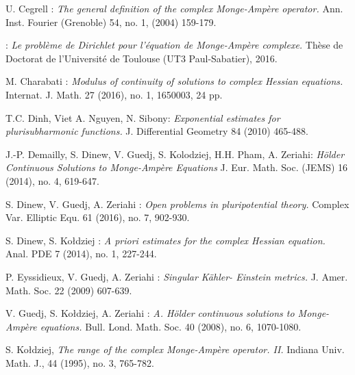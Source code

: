 \documentclass[12pt]{amsart}
\theoremstyle{definition}
\numberwithin{theorem}{section}
\numberwithin{equation}{section}
\begin{document}
{\begin{thebibliography}{X-XX}
 {U. Cegrell} : {\it  The general definition of the complex Monge-Amp\`ere operator.} Ann. Inst. Fourier (Grenoble) 54, no. 1, (2004) 159-179.
 
 
  : {\it Le probl\`eme de Dirichlet pour l'\'equation de Monge-Amp\`ere complexe.} Th\`ese de Doctorat de l'Universit\'e de Toulouse (UT3 Paul-Sabatier), 2016.


 {M. Charabati} :  {\it  Modulus of continuity of solutions to complex Hessian equations.} Internat. J. Math. 27 (2016), no. 1, 1650003, 24 pp.

 


 T.C. Dinh, Viet A. Nguyen, N. Sibony: {\it Exponential estimates for plurisubharmonic functions.} J. Differential Geometry 84 (2010) 465-488.

 J.-P. Demailly, S. Dinew, V. Guedj, S. Kolodziej, H.H. Pham, A. Zeriahi: {\it H\"older Continuous Solutions to Monge-Amp\`ere Equations} J. Eur. Math. Soc. (JEMS) 16 (2014), no. 4, 619-647. 

 {S. Dinew, V. Guedj, A. Zeriahi} : {\it Open problems in pluripotential theory. }  Complex Var. Elliptic Equ. 61 (2016), no. 7, 902-930. 


 S. Dinew, S. Ko\l dziej :  {\it  A priori estimates for the complex Hessian equation.}  Anal. PDE 7 (2014), no. 1, 227-244. 

 {P. Eyssidieux, V. Guedj, A. Zeriahi} : {\it Singular K\"ahler- Einstein metrics.}  J. Amer. Math. Soc.  22 (2009) 607-639.


 V.  Guedj, S. Ko\l dziej, A. Zeriahi : {\it  A. H\"older continuous solutions to Monge-Amp\`ere equations.} Bull. Lond. Math. Soc. 40 (2008), no. 6, 1070-1080. 
 
 
 
 
  S.  Ko\l dziej, {\it The range of the complex Monge-Amp\`ere operator. II.}  Indiana Univ. Math. J., 44 (1995), no. 3, 765-782.



\end{thebibliography}}
\end{document}
